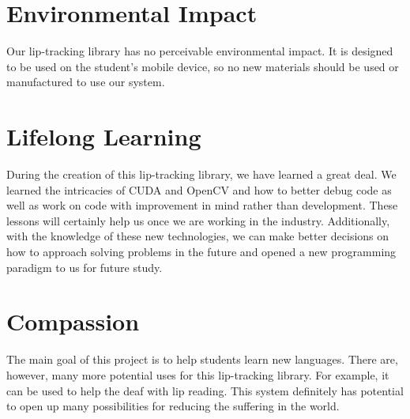 \section{Environmental Impact}
Our lip-tracking library has no perceivable environmental impact. It is designed to be used on the student's mobile device, so no new materials should be used or manufactured to use our system.

\section{Lifelong Learning}
During the creation of this lip-tracking library, we have learned a great deal. We learned the intricacies of CUDA and OpenCV and how to better debug code as well as work on code with improvement in mind rather than development. These lessons will certainly help us once we are working in the industry. Additionally, with the knowledge of these new technologies, we can make better decisions on how to approach solving problems in the future and opened a new programming paradigm to us for future study.

\section{Compassion}
The main goal of this project is to help students learn new languages. There are, however, many more potential uses for this lip-tracking library. For example, it can be used to help the deaf with lip reading. This system definitely has potential to open up many possibilities for reducing the suffering in the world.